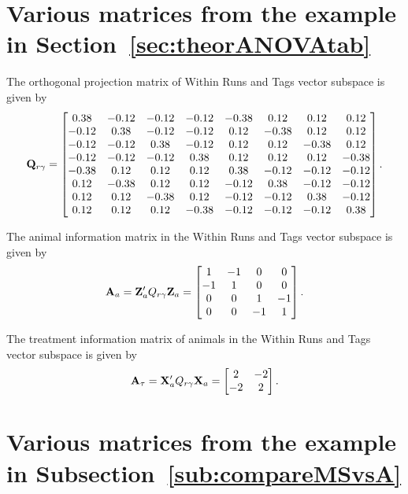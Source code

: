 \chapter{Various matrices from the example in Section~\ref{sec:theorANOVAtab}} \label{append:theorANOVAtab}

The orthogonal projection matrix of Within Runs and Tags vector subspace is given by
\[
\mathbf{Q}_{r\gamma} = 
\begin{bmatrix} 
 0.38 & -0.12 & -0.12 & -0.12 & -0.38 & 0.12 & 0.12 & 0.12 \\ 
  -0.12 & 0.38 & -0.12 & -0.12 & 0.12 & -0.38 & 0.12 & 0.12 \\ 
  -0.12 & -0.12 & 0.38 & -0.12 & 0.12 & 0.12 & -0.38 & 0.12 \\ 
  -0.12 & -0.12 & -0.12 & 0.38 & 0.12 & 0.12 & 0.12 & -0.38 \\ 
  -0.38 & 0.12 & 0.12 & 0.12 & 0.38 & -0.12 & -0.12 & -0.12 \\ 
  0.12 & -0.38 & 0.12 & 0.12 & -0.12 & 0.38 & -0.12 & -0.12 \\ 
  0.12 & 0.12 & -0.38 & 0.12 & -0.12 & -0.12 & 0.38 & -0.12 \\ 
  0.12 & 0.12 & 0.12 & -0.38 & -0.12 & -0.12 & -0.12 & 0.38 \\ 
\end{bmatrix} . 
\]

The animal information matrix in the Within Runs and Tags vector subspace is given by 
\[
\mathbf{A}_{a} = 
 \mathbf{Z}_{a}' Q_{r\gamma} \mathbf{Z}_{a} = 
\begin{bmatrix} 
 1 & -1 & 0 & 0 \\ 
 -1 & 1 & 0 & 0 \\ 
 0 & 0 & 1 & -1 \\ 
 0 & 0 & -1 & 1 \\ 
\end{bmatrix}.  
\]


The treatment information matrix of animals in the Within Runs and Tags vector subspace is given by 
\[
\mathbf{A}_{\tau} = 
 \mathbf{X}_{a}' Q_{r\gamma} \mathbf{X}_{a} = 
\begin{bmatrix} 
 2 & -2 \\ 
 -2 & 2 \\ 
\end{bmatrix}.  
\]

\chapter{Various matrices from the example in Subsection~\ref{sub:compareMSvsA}} \label{append:compareMSvsA}


